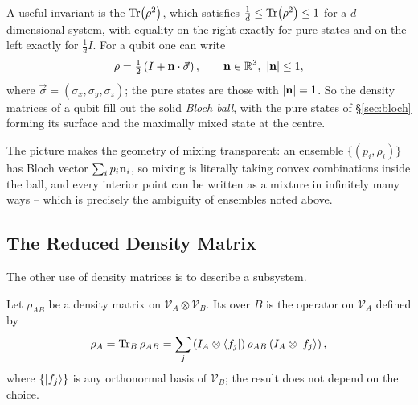 \documentclass[a4paper]{scrartcl}
\newcommand{\Vs}{\mathcal{V}}
\begin{document}
A useful invariant is the  $\Tr(\rho^2)$, which satisfies $\tfrac1d\leq\Tr(\rho^2)\leq1$ for a $d$-dimensional system, with equality on the right exactly for pure states and on the left exactly for $\tfrac1dI$. For a qubit one can write
$$\rho = \tfrac12\left(I + \vv{n}\cdot\vec\sigma\right), \qquad \vv n\in\R^3,\ \abs{\vv n}\leq1,$$
where $\vec\sigma = (\sigma_x,\sigma_y,\sigma_z)$; the pure states are those with $\lvert\mathbf{n}\rvert=1$. So the density matrices of a qubit fill out the solid \emph{Bloch ball}, with the pure states of \S\ref{sec:bloch} forming its surface and the maximally mixed state at the centre.

\begin{center}
\end{center}

The picture makes the geometry of mixing transparent: an ensemble $\{(p_i,\rho_i)\}$ has Bloch vector $\sum_ip_i\mathbf{n}_i$, so mixing is literally taking convex combinations inside the ball, and every interior point can be written as a mixture in infinitely many ways -- which is precisely the ambiguity of ensembles noted above.

\subsection{The Reduced Density Matrix}\label{sec:reduced}

The other use of density matrices is to describe a subsystem.

\begin{definition}
	Let $\rho_{AB}$ be a density matrix on $\Vs_A\otimes\Vs_B$. Its  over $B$ is the operator on $\Vs_A$ defined by
	$$\rho_A = \Tr_B\rho_{AB} = \sum_j\left(I_A\otimes\bra{f_j}\right)\rho_{AB}\left(I_A\otimes\ket{f_j}\right),$$
	where $\{\ket{f_j}\}$ is any orthonormal basis of $\Vs_B$; the result does not depend on the choice.
\end{definition}
\end{document}

